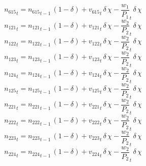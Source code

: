 \begin{dmath}
{{n_{615}}}_{t}={{n_{615}}}_{t-1}\, \left(1-{{\delta}}\right)+{{v_{615}}}_{t}\, {{\delta}}\, {{\chi}}-{{\frac{w_{1}}{P_{1}}}}_{t}\, {{\delta}}\, {{\chi}}
\end{dmath}
\begin{dmath}
{{n_{121}}}_{t}={{n_{121}}}_{t-1}\, \left(1-{{\delta}}\right)+{{v_{121}}}_{t}\, {{\delta}}\, {{\chi}}-{{\frac{w_{2}}{P_{2}}}}_{t}\, {{\delta}}\, {{\chi}}
\end{dmath}
\begin{dmath}
{{n_{122}}}_{t}={{n_{122}}}_{t-1}\, \left(1-{{\delta}}\right)+{{v_{122}}}_{t}\, {{\delta}}\, {{\chi}}-{{\frac{w_{2}}{P_{2}}}}_{t}\, {{\delta}}\, {{\chi}}
\end{dmath}
\begin{dmath}
{{n_{123}}}_{t}={{n_{123}}}_{t-1}\, \left(1-{{\delta}}\right)+{{v_{123}}}_{t}\, {{\delta}}\, {{\chi}}-{{\frac{w_{2}}{P_{2}}}}_{t}\, {{\delta}}\, {{\chi}}
\end{dmath}
\begin{dmath}
{{n_{124}}}_{t}={{n_{124}}}_{t-1}\, \left(1-{{\delta}}\right)+{{v_{124}}}_{t}\, {{\delta}}\, {{\chi}}-{{\frac{w_{2}}{P_{2}}}}_{t}\, {{\delta}}\, {{\chi}}
\end{dmath}
\begin{dmath}
{{n_{125}}}_{t}={{n_{125}}}_{t-1}\, \left(1-{{\delta}}\right)+{{v_{125}}}_{t}\, {{\delta}}\, {{\chi}}-{{\frac{w_{2}}{P_{2}}}}_{t}\, {{\delta}}\, {{\chi}}
\end{dmath}
\begin{dmath}
{{n_{221}}}_{t}={{n_{221}}}_{t-1}\, \left(1-{{\delta}}\right)+{{v_{221}}}_{t}\, {{\delta}}\, {{\chi}}-{{\frac{w_{2}}{P_{2}}}}_{t}\, {{\delta}}\, {{\chi}}
\end{dmath}
\begin{dmath}
{{n_{222}}}_{t}={{n_{222}}}_{t-1}\, \left(1-{{\delta}}\right)+{{v_{222}}}_{t}\, {{\delta}}\, {{\chi}}-{{\frac{w_{2}}{P_{2}}}}_{t}\, {{\delta}}\, {{\chi}}
\end{dmath}
\begin{dmath}
{{n_{223}}}_{t}={{n_{223}}}_{t-1}\, \left(1-{{\delta}}\right)+{{v_{223}}}_{t}\, {{\delta}}\, {{\chi}}-{{\frac{w_{2}}{P_{2}}}}_{t}\, {{\delta}}\, {{\chi}}
\end{dmath}
\begin{dmath}
{{n_{224}}}_{t}={{n_{224}}}_{t-1}\, \left(1-{{\delta}}\right)+{{v_{224}}}_{t}\, {{\delta}}\, {{\chi}}-{{\frac{w_{2}}{P_{2}}}}_{t}\, {{\delta}}\, {{\chi}}
\end{dmath}
